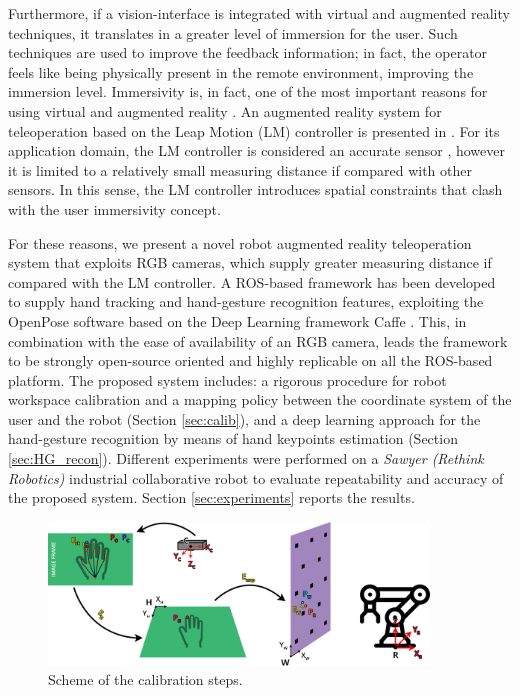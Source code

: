 \documentclass[a4paper, 10 pt, conference]{ieeeconf}      %
\begin{document}
Furthermore, if a vision-interface is integrated with virtual and augmented reality techniques, it translates in a greater level of immersion for the user. Such techniques are used to improve the feedback information; in fact, the operator feels like being physically present in the remote environment, improving the immersion level. Immersivity is, in fact, one of the most important reasons for using virtual and augmented reality \cite{Boboc2012}.
An augmented reality system for teleoperation based on the Leap Motion (LM) controller is presented in \cite{Peppoloni2015}. For its application domain, the LM controller is considered an accurate sensor \cite{Hedayati2018}, however it is limited to a relatively small measuring distance if compared with other sensors. In this sense, the LM controller introduces spatial constraints that clash with the user immersivity concept.

For these reasons, we present a novel robot augmented reality teleoperation system that exploits RGB cameras, which supply greater measuring distance if compared with the LM controller. A ROS-based framework has been developed to supply hand tracking and hand-gesture recognition features, exploiting the OpenPose software \cite{simon2017hand, cao2018openpose} based on the Deep Learning framework Caffe \cite{jia2014caffe}.
This, in combination with the ease of availability of an RGB camera, leads the framework to be strongly open-source oriented and highly replicable on all the ROS-based platform. The proposed system includes: a rigorous procedure for robot workspace calibration and a mapping policy between the coordinate system of the user and the robot (Section \ref{sec:calib}), and a deep learning approach for the hand-gesture recognition by means of hand keypoints estimation (Section \ref{sec:HG_recon}).
Different experiments were performed on a \textit{Sawyer (Rethink Robotics)} industrial collaborative robot to evaluate repeatability and accuracy of the proposed system. Section \ref{sec:experiments} reports the results.

\begin{figure}[ht]
\centering
  \includegraphics[width=0.9\textwidth]{figures/horizcalib}
  \caption{Scheme of the calibration steps.}
  \label{fig:wscalib}
\end{figure}
\end{document}
